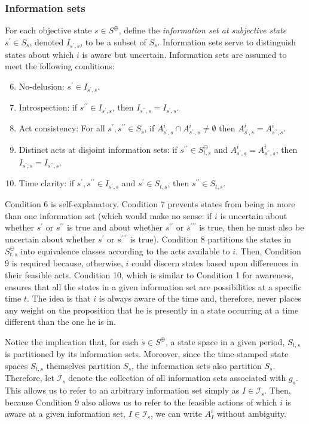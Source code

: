 \documentclass[
11pt,
titlepage,
reqno,
]{article}%
\theoremstyle{definition}
\begin{document}
\subsubsection{Information sets}
For each objective state $s\in S^\oplus$, define the\textit{ information set at subjective state} $s^\prime\in S_s$, denoted $I_{s^\prime,s}$,  to be a subset of $S_s$.  
Information sets serve to distinguish states about which $i$ is aware but uncertain. 
Information sets are assumed to meet the following conditions:	
\begin{enumerate}
	\setcounter{enumi}{5}
	\item No-delusion: $s^\prime\in I_{s^\prime,s}$.
	\item Introspection: if $s^{\prime\prime}\in I_{s^\prime,s}$, then $I_{s^{\prime\prime},s}=I_{s^\prime,s}$.
	\item Act consistency: For all $s^\prime,s^{\prime\prime}\in S_s$, if $A^i_{s^\prime,s}\cap A^i_{s^{\prime\prime},s}\ne \emptyset$ then $A^i_{s^\prime,s}= A^i_{s^{\prime\prime},s}$.
	\item Distinct acts at disjoint information sets: if $s^{\prime\prime}\in S^\ominus_{t,s}$ and $A^i_{s^\prime,s}= A^i_{s^{\prime\prime},s}$, then $I_{s^\prime,s}=I_{s^{\prime\prime},s}$.
	\item Time clarity: if $s^\prime,s^{\prime\prime}\in I_{s^\prime,s}$ and $s^\prime\in S_{t,s}$, then $s^{\prime\prime}\in S_{t,s}$.
\end{enumerate}

Condition 6 is self-explanatory. 
Condition 7 prevents states from being in more than one information set (which would make no sense: if $i$ is uncertain about whether $s^{\prime}$ or $s^{\prime\prime}$ is true and about whether $s^{\prime\prime}$ or $s^{\prime\prime\prime}$ is true, then he must also be uncertain about whether $s^{\prime}$ or $s^{\prime\prime\prime}$ is true).
Condition 8  partitions the states in $S^\ominus_{t,s}$ into equivalence classes according to the acts available to $i$.
Then, Condition 9 is required because, otherwise, $i$ could discern states based upon differences in their feasible acts.
Condition 10, which is similar to Condition 1 for awareness, ensures that all the states in a given information set are possibilities at a specific time $t$.
The idea is that $i$ is always aware of the time and, therefore, never places any weight on the proposition that he is presently in a state occurring at a time different than the one he is in. 


Notice the implication that, for each $s\in S^\oplus$, a state space in a given period, $S_{t,s}$ is partitioned by its information sets.
Moreover, since the time-stamped state spaces $S_{t,s}$ themselves partition $S_s$, the information sets also partition $S_s$.
Therefore, let $\mathcal{I}_s$ denote the collection of all information sets associated with $g_s$.
This allows us to refer to an arbitrary information set simply as $I\in\mathcal{I}_s$.
Then, because Condition 9 also allows us to refer to the feasible actions of which $i$ is aware at a given information set, $I\in\mathcal{I}_s$, we can write $A^i_I$ without ambiguity.
	
\end{document}

